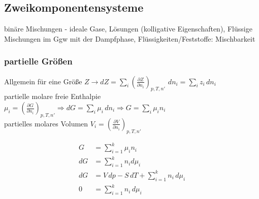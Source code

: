 \documentclass[a4paper, fleqn]{article}
\begin{document}
\subsection{Zweikomponentensysteme}
binäre Mischungen - ideale Gase, Lösungen (kolligative Eigenschaften), Flüssige Mischungen im Ggw mit der Dampfphase, Flüssigkeiten/Feststoffe: Mischbarkeit\\

\subsubsection{partielle Größen}
Allgemein für eine Größe $Z \rightarrow dZ = \sum_{i} \left(\frac{\partial Z}{\partial n_i}\right)_{p,T,n'}$ $dn_i = \sum_{i} z_i \,dn_i$\\
partielle molare freie Enthalpie $\mu_i = \left(\frac{\partial G}{\partial n_i}\right)_{p,T,n'} \Rightarrow dG = \sum_{i} \mu_i\,dn_i \Rightarrow G = \sum_{i}\mu_in_i$\\
partielles molares Volumen $V_i = \left(\frac{\partial V}{\partial n_i}\right)_{p,T,n'}$

\begin{align*}
    G &= \sum_{i=1}^{k} \mu_in_i\\
    dG &= \sum_{i=1}^{k} n_id\mu_i\\
    dG &= V\,dp - S\,dT + \sum_{i=1}^{k}n_i\,d\mu_i\\
    0 &= \sum_{i=1}^{k} n_i\,d\mu_i\\
\end{align*}
\end{document}
